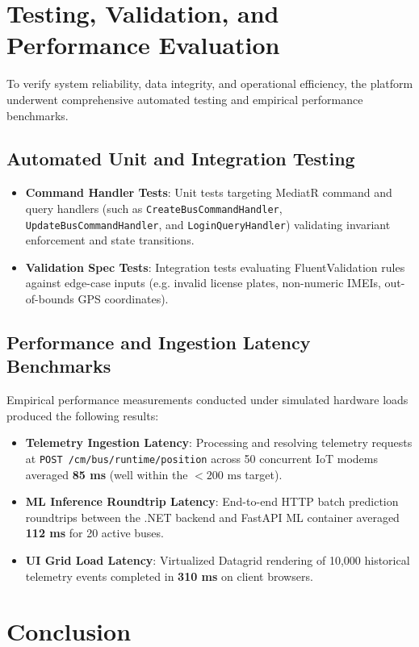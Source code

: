 \section{Testing, Validation, and Performance Evaluation}
\label{sec:impl_testing_benchmarks}

To verify system reliability, data integrity, and operational efficiency, the platform underwent comprehensive automated testing and empirical performance benchmarks.

\subsection{Automated Unit and Integration Testing}
\begin{itemize}
  \item \textbf{Command Handler Tests}: Unit tests targeting MediatR command and query handlers (such as \texttt{CreateBusCommandHandler}, \texttt{UpdateBusCommandHandler}, and \texttt{LoginQueryHandler}) validating invariant enforcement and state transitions.
  \item \textbf{Validation Spec Tests}: Integration tests evaluating FluentValidation rules against edge-case inputs (e.g. invalid license plates, non-numeric IMEIs, out-of-bounds GPS coordinates).
\end{itemize}

\subsection{Performance and Ingestion Latency Benchmarks}
Empirical performance measurements conducted under simulated hardware loads produced the following results:
\begin{itemize}
  \item \textbf{Telemetry Ingestion Latency}: Processing and resolving telemetry requests at \texttt{POST /cm/bus/runtime/position} across 50 concurrent IoT modems averaged \textbf{85 ms} (well within the $<200\text{ ms}$ target).
  \item \textbf{ML Inference Roundtrip Latency}: End-to-end HTTP batch prediction roundtrips between the .NET backend and FastAPI ML container averaged \textbf{112 ms} for 20 active buses.
  \item \textbf{UI Grid Load Latency}: Virtualized Datagrid rendering of 10,000 historical telemetry events completed in \textbf{310 ms} on client browsers.
\end{itemize}

\section{Conclusion}
\label{sec:impl_conclusion}

